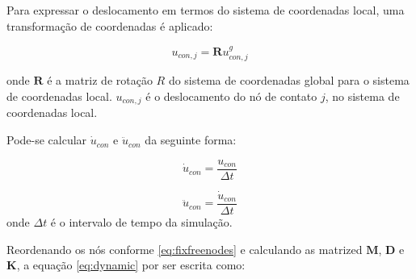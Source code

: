 Para expressar o deslocamento em termos do sistema de coordenadas local, uma transformação de coordenadas é aplicado:

\begin{equation} \label{eq:localglobaldisp}
    u_{con, j} = \pmb{R}u^{g}_{con, j} 
\end{equation}

onde $\pmb{R}$ é a matriz de rotação $R$ do sistema de coordenadas global para o sistema de coordenadas local. $u_{con, j}$ é o deslocamento do nó de contato $j$, no sistema de coordenadas local.

Pode-se calcular $\dot{u}_{con}$ e $\ddot{u}_{con}$ da seguinte forma:

\begin{equation}\label{eq:velocdisp}
    \dot{u}_{con} = \frac{{u}_{con}}{\Delta t}
\end{equation}

\begin{equation} \label{eq:accdisp}
        \ddot{u}_{con} = \frac{{\dot{u}}_{con}}{\Delta t}
\end{equation}
onde $\Delta t$ é o intervalo de tempo da simulação.

Reordenando os nós conforme \ref{eq:fixfreenodes} e calculando as matrized $\pmb{M}$, $\pmb{D}$ e $\pmb{K}$, a equação \ref{eq:dynamic} por ser escrita como:

